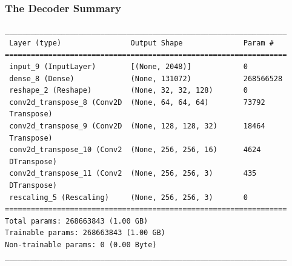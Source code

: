\documentclass{article}
\begin{document}
\subsubsection{The Decoder Summary}
\begin{verbatim}
_________________________________________________________________
 Layer (type)                Output Shape              Param #   
=================================================================
 input_9 (InputLayer)        [(None, 2048)]            0         
 dense_8 (Dense)             (None, 131072)            268566528 
 reshape_2 (Reshape)         (None, 32, 32, 128)       0         
 conv2d_transpose_8 (Conv2D  (None, 64, 64, 64)        73792     
 Transpose)                                                      
 conv2d_transpose_9 (Conv2D  (None, 128, 128, 32)      18464     
 Transpose)                                                      
 conv2d_transpose_10 (Conv2  (None, 256, 256, 16)      4624      
 DTranspose)                                                     
 conv2d_transpose_11 (Conv2  (None, 256, 256, 3)       435       
 DTranspose)                                                     
 rescaling_5 (Rescaling)     (None, 256, 256, 3)       0         
=================================================================
Total params: 268663843 (1.00 GB)
Trainable params: 268663843 (1.00 GB)
Non-trainable params: 0 (0.00 Byte)
_________________________________________________________________
\end{verbatim}

\newpage


\end{document}

